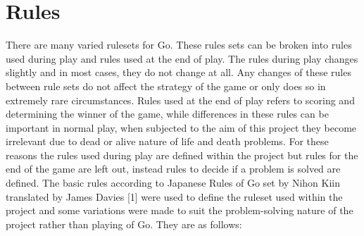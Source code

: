 \documentclass{l4proj}
\begin{document}
\section{Rules}

There are many varied rulesets for Go. These rules sets can be broken into rules used during play and rules used at the end of play. The rules during play changes slightly and in most cases, they do not change at all. Any changes of these rules between rule sets do not affect the strategy of the game or only does so in extremely rare circumstances. Rules used at the end of play refers to scoring and determining the winner of the game, while differences in these rules can be important in normal play, when subjected to the aim of this project they become irrelevant due to dead or alive nature of life and death problems. For these reasons the rules used during play are defined within the project but rules for the end of the game are left out, instead rules to decide if a problem is solved are defined. The basic rules according to Japanese Rules of Go set by Nihon Kiin translated by James Davies [1] were used to define the ruleset used within the project and some variations were made to suit the problem-solving nature of the project rather than playing of Go. They are as follows:
\end{document}
